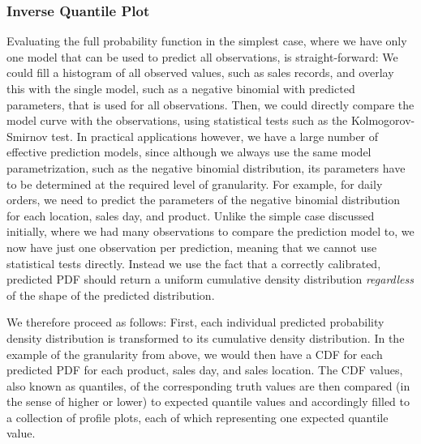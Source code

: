 \documentclass[BCOR=1mm, DIV=calc,10pt,
twoside=true,
twocolumn,
headings=normal]{scrartcl}
\begin{document}
\subsubsection{Inverse Quantile Plot}
Evaluating the full probability function in the simplest case, where we have only one model that can be used to predict all observations, is straight-forward: We could fill a histogram of all observed values, such as sales records, and overlay this with the single model, such as a negative binomial with predicted parameters, that is used for all observations. Then, we could directly compare the model curve with the observations, using statistical tests such as the Kolmogorov-Smirnov test. In practical applications however, we have a large number of effective prediction models, since although we always use the same model parametrization, such as the negative binomial distribution, its parameters have to be determined at the required level of granularity. For example, for daily orders, we need to predict the parameters of the negative binomial distribution for each location, sales day, and product. Unlike the simple case discussed initially, where we had many observations to compare the prediction model to, we now have just one observation per prediction, meaning that we cannot use statistical tests directly. Instead we use the fact that a correctly calibrated, predicted PDF should return a uniform cumulative density distribution {\em regardless} of the shape of the predicted distribution.

We therefore proceed as follows: First, each individual predicted probability density distribution is transformed to its cumulative density distribution. In the example of the granularity from above, we would then have a CDF for each predicted PDF for each product, sales day, and sales location. The CDF values, also known as quantiles, of the corresponding truth values are then compared (in the sense of higher or lower) to expected quantile values and accordingly filled to a collection of profile plots, each of which representing one expected quantile value.
\end{document}
